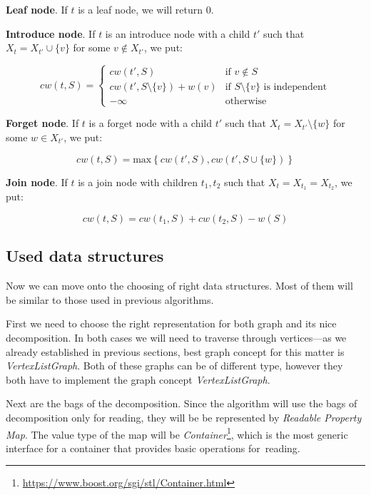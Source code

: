 \documentclass[thesis=B,english]{FITthesis}[2019/03/21]
\begin{document}
\noindent\textbf{Leaf node}. If $t$ is a leaf node, we will return $0$.\medskip

\noindent\textbf{Introduce node}. If $t$ is an introduce node with a child $t'$ such that \linebreak $X_t = X_{t'} \cup \{v\}$ for some $v \not\in X_{t'}$, we put:

\begin{equation}
cw(t, S) = 
	\begin{cases}
		cw(t', S) & \text{if $v \not\in S$}\\
		cw(t', S \setminus \{v\}) + w(v) & \text{if $S \setminus \{v\}$ is independent}\\
		-\infty & \text{otherwise}
	\end{cases}
\end{equation}

\noindent\textbf{Forget node}. If $t$ is a forget node with a child $t'$ such that $X_t = X_{t'} \setminus \{w\}$ for some $w \in X_{t'}$, we put:

\begin{equation}
cw(t, S) = \text{max} \left\{ cw(t',S), cw(t', S \cup \{ w \}) \right\}
\end{equation}

\noindent\textbf{Join node}. If $t$ is a join node with children $t_1,t_2$ such that $X_t = X_{t_1} = X_{t_2}$, we put:

\begin{equation}
cw(t,S) = cw(t_1,S) + cw(t_2,S) - w(S)
\end{equation}

\subsection{Used data structures}\label{ssec:mwis_data_structure}
Now we can move onto the choosing of right data structures. Most of them will be similar to those used in previous algorithms.

First we need to choose the right representation for both graph and its nice decomposition. In both cases we will need to traverse through vertices---as we already established in previous sections, best graph concept for this matter is \emph{VertexListGraph}. Both of these graphs can be of different type, however they both have to implement the graph concept \emph{VertexListGraph}.

Next are the bags of the decomposition. Since the algorithm will use the bags of decomposition only for reading, they will be be represented by \emph{Readable Property Map}. The value type of the map will be \emph{Container}\footnote{\url{https://www.boost.org/sgi/stl/Container.html}}, which is the most generic interface for a container that provides basic operations for~reading. 
\end{document}
